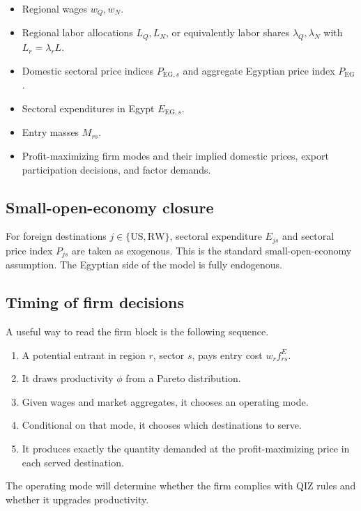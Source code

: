 \documentclass[11pt]{article}
\begin{document}
\begin{itemize}[leftmargin=*]
    \item Regional wages \(w_Q,w_N\).
    \item Regional labor allocations \(L_Q,L_N\), or equivalently labor shares \(\lambda_Q,\lambda_N\) with \(L_r=\lambda_r L\).
    \item Domestic sectoral price indices \(P_{\mathrm{EG},s}\) and aggregate Egyptian price index \(P_{\mathrm{EG}}\).
    \item Sectoral expenditures in Egypt \(E_{\mathrm{EG},s}\).
    \item Entry masses \(M_{rs}\).
    \item Profit-maximizing firm modes and their implied domestic prices, export participation decisions, and factor demands.
\end{itemize}

\subsection{Small-open-economy closure}

For foreign destinations \(j\in\{\mathrm{US},\mathrm{RW}\}\), sectoral expenditure \(E_{js}\) and sectoral price index \(P_{js}\) are taken as exogenous. This is the standard small-open-economy assumption. The Egyptian side of the model is fully endogenous.

\subsection{Timing of firm decisions}

A useful way to read the firm block is the following sequence.
\begin{enumerate}[leftmargin=*]
    \item A potential entrant in region \(r\), sector \(s\), pays entry cost \(w_r f^E_{rs}\).
    \item It draws productivity \(\phi\) from a Pareto distribution.
    \item Given wages and market aggregates, it chooses an operating mode.
    \item Conditional on that mode, it chooses which destinations to serve.
    \item It produces exactly the quantity demanded at the profit-maximizing price in each served destination.
\end{enumerate}

The operating mode will determine whether the firm complies with QIZ rules and whether it upgrades productivity.
\end{document}
